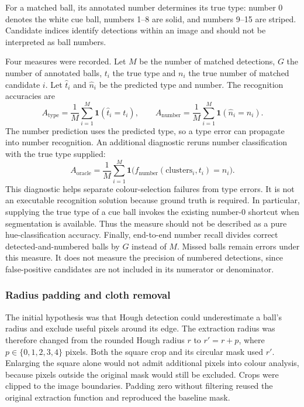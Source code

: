 For a matched ball, its annotated number determines its true type: number 0
denotes the white cue ball, numbers 1--8 are solid, and numbers 9--15 are
striped. Candidate indices identify detections within an image and should not
be interpreted as ball numbers.

Four measures were recorded. Let $M$ be the number of matched detections,
$G$ the number of annotated balls, $t_i$ the true type and $n_i$ the true
number of matched candidate $i$. Let $\hat{t}_i$ and $\hat{n}_i$ be the
predicted type and number. The recognition accuracies are
\[
 A_{\mathrm{type}}=\frac{1}{M}\sum_{i=1}^{M}
       \mathbf{1}(\hat{t}_i=t_i),\qquad
 A_{\mathrm{number}}=\frac{1}{M}\sum_{i=1}^{M}
       \mathbf{1}(\hat{n}_i=n_i).
\]
The number prediction uses the predicted type, so a type error can propagate
into number recognition. An additional diagnostic reruns number classification
with the true type supplied:
\[
 A_{\mathrm{oracle}}=\frac{1}{M}\sum_{i=1}^{M}
       \mathbf{1}\bigl(f_{\mathrm{number}}(\mathrm{clusters}_i,t_i)=n_i\bigr).
\]
This diagnostic helps separate colour-selection failures from type errors.
It is not an executable recognition solution because ground truth is required.
In particular, supplying the true type of a cue ball invokes the existing
number-0 shortcut when segmentation is available. Thus the measure should not
be described as a pure hue-classification accuracy. Finally, end-to-end number
recall divides correct detected-and-numbered balls by $G$ instead of $M$.
Missed balls remain errors under this measure. It does not measure the
precision of numbered detections, since false-positive candidates are not
included in its numerator or denominator.

\subsubsection{Radius padding and cloth removal}

The initial hypothesis was that Hough detection could underestimate a ball's
radius and exclude useful pixels around its edge. The extraction radius was
therefore changed from the rounded Hough radius $r$ to
$r'=r+p$, where $p\in\{0,1,2,3,4\}$ pixels. Both the square crop and its
circular mask used $r'$. Enlarging the square alone would not admit additional
pixels into colour analysis, because pixels outside the original mask would
still be excluded. Crops were clipped to the image boundaries. Padding zero
without filtering reused the original extraction function and reproduced the
baseline mask.

